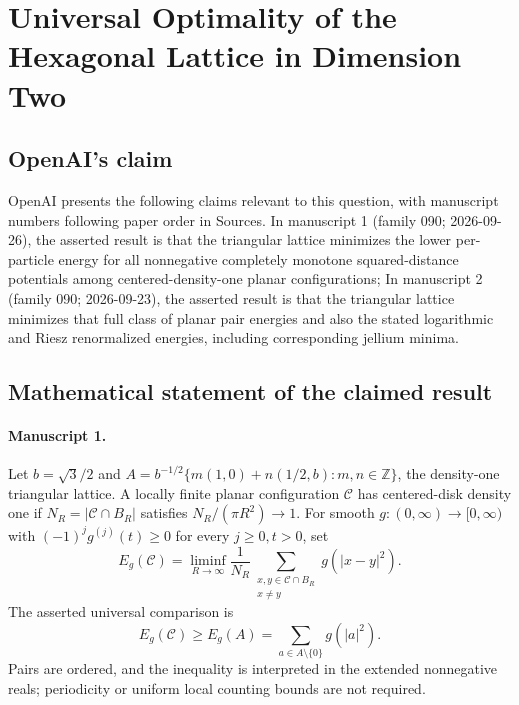 \documentclass[11pt]{article}
\begin{document}
\section*{Universal Optimality of the Hexagonal Lattice in Dimension Two}

\subsection{OpenAI's claim}
OpenAI presents the following claims relevant to this question, with manuscript numbers following paper order in Sources. In manuscript 1 (family 090; 2026-09-26), the asserted result is that the triangular lattice minimizes the lower per-particle energy for all nonnegative completely monotone squared-distance potentials among centered-density-one planar configurations; In manuscript 2 (family 090; 2026-09-23), the asserted result is that the triangular lattice minimizes that full class of planar pair energies and also the stated logarithmic and Riesz renormalized energies, including corresponding jellium minima.

\subsection{Mathematical statement of the claimed result}
\paragraph{Manuscript 1.}
Let $b=\sqrt3/2$ and $A=b^{-1/2}\{m(1,0)+n(1/2,b):m,n\in\mathbb Z\}$, the density-one triangular lattice. A locally finite planar configuration $\mathcal C$ has centered-disk density one if $N_R=|\mathcal C\cap B_R|$ satisfies $N_R/(\pi R^2)\to1$. For smooth $g:(0,\infty)\to[0,\infty)$ with $(-1)^jg^{(j)}(t)\ge0$ for every $j\ge0,t>0$, set
\[
 E_g(\mathcal C)=\liminf_{R\to\infty}\frac1{N_R}
 \sum_{\substack{x,y\in\mathcal C\cap B_R\\x\ne y}}g(|x-y|^2).
\]
The asserted universal comparison is
\[
 E_g(\mathcal C)\ge E_g(A)=\sum_{a\in A\setminus\{0\}}g(|a|^2).
\]
Pairs are ordered, and the inequality is interpreted in the extended nonnegative reals; periodicity or uniform local counting bounds are not required.
\end{document}
